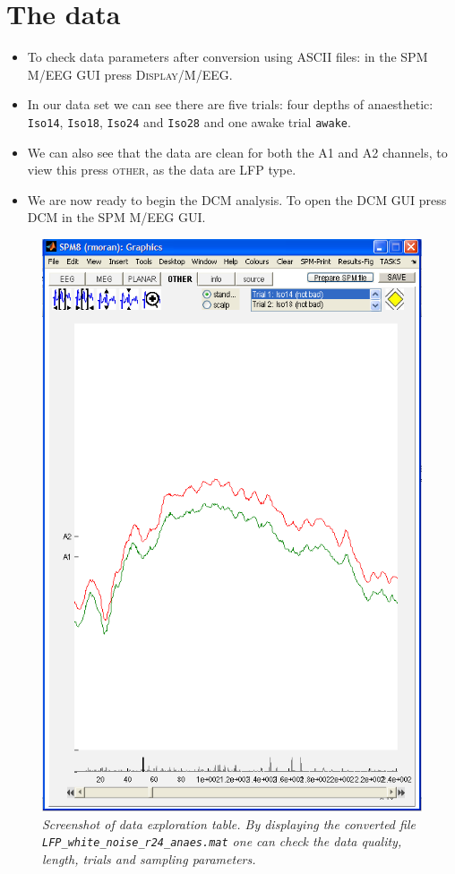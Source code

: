 \section{The data}

\begin{itemize}
\item To check data parameters after conversion using ASCII files: in the SPM M/EEG GUI press \textsc{Display/M/EEG}.
\item In our data set we can see there are five trials: four depths of anaesthetic: \texttt{Iso14}, \texttt{Iso18}, \texttt{Iso24} and \texttt{Iso28} and one awake trial \texttt{awake}.
\item We can also see that the data are clean for both the A1 and A2 channels, to view this press \textsc{other}, as the data are LFP type.
\item We are now ready to begin the DCM analysis. To open the DCM GUI press \textsc{DCM} in the SPM M/EEG GUI.
\end{itemize}

\begin{figure}
\begin{center}
\includegraphics[width=140mm]{dcm_ssr/fig1}
\caption{\em Screenshot of data exploration table. By displaying the converted file \texttt{LFP\_white\_noise\_r24\_anaes.mat} one can check the data quality, length, trials and sampling parameters. \label{dcm_ssr:fig1}}
\end{center}
\end{figure}

